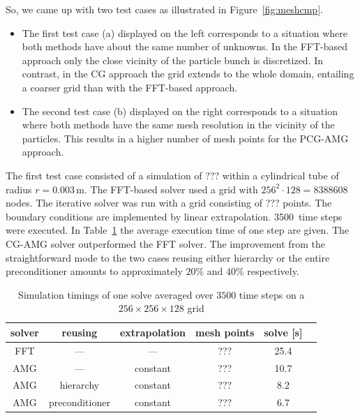 So, we came up with two test cases as illustrated in
Figure~\ref{fig:meshcmp}.
\begin{itemize}
\item The first test case (a) displayed on the left corresponds to a
  situation where both methods have about the same number of unknowns.
  In the FFT-based approach only the close vicinity of the particle
  bunch is discretized.  In contrast, in the CG approach the grid
  extends to the whole domain, entailing a coarser grid than with the
  FFT-based approach.

\item The second test case (b) displayed on the right corresponds to a
  situation where both methods have the same mesh resolution in the
  vicinity of the particles.  This results in a higher number of mesh
  points for the PCG-AMG approach.
\end{itemize}

The first test case consisted of a simulation of ??? within a
cylindrical tube of radius $r=0.003$\,m.  The FFT-based solver used a
grid with $256^2\cdot128=8388608$ nodes.  The iterative solver was run
with a grid consisting of ???  points.  The boundary conditions are
implemented by linear extrapolation.  3500~time steps were executed.  In
Table~\ref{tbl:timings_variations_overview} the average execution time
of one step are given.  The CG-AMG solver outperformed the FFT solver.
The improvement from the straightforward mode to the two cases reusing
either hierarchy or the entire preconditioner amounts to approximately
$20\%$ and $40\%$ respectively.
\begin{table}[ht]
  \begin{center}
    \begin{tabular}{*{6}{c}}
      \hline
      solver & reusing & extrapolation & mesh points & solve [s] \\
      \hline 
      FFT & --- & --- & ??? & 25.4  \\
      AMG & --- & constant & ??? & 10.7  \\
      AMG & hierarchy & constant & ??? & 8.2  \\
      AMG & preconditioner & constant & ??? &6.7  \\
      \hline
    \end{tabular}
    \caption{Simulation timings of one solve averaged over $3500$
      time steps on a $256\times256\times128$
      grid} %
    \label{tbl:timings_variations_overview}
  \end{center}
\end{table}

